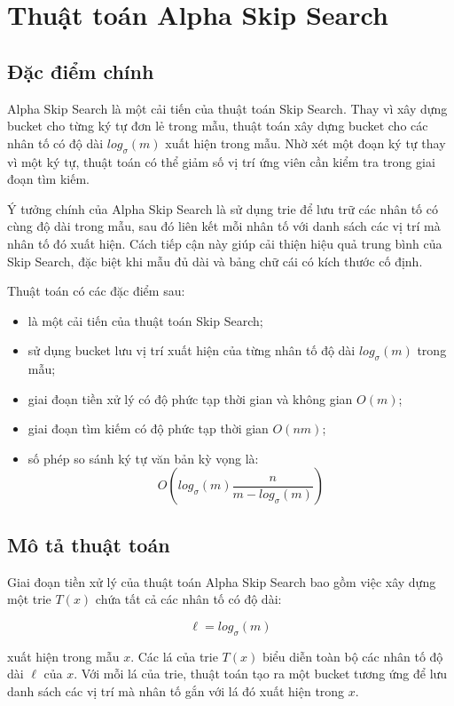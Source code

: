 \section{Thuật toán Alpha Skip Search}

\subsection{Đặc điểm chính}
Alpha Skip Search là một cải tiến của thuật toán Skip Search. Thay vì xây dựng bucket cho từng ký tự đơn lẻ trong mẫu, thuật toán xây dựng bucket cho các nhân tố có độ dài $log_{\sigma}(m)$ xuất hiện trong mẫu. Nhờ xét một đoạn ký tự thay vì một ký tự, thuật toán có thể giảm số vị trí ứng viên cần kiểm tra trong giai đoạn tìm kiếm.

Ý tưởng chính của Alpha Skip Search là sử dụng trie để lưu trữ các nhân tố có cùng độ dài trong mẫu, sau đó liên kết mỗi nhân tố với danh sách các vị trí mà nhân tố đó xuất hiện. Cách tiếp cận này giúp cải thiện hiệu quả trung bình của Skip Search, đặc biệt khi mẫu đủ dài và bảng chữ cái có kích thước cố định.

Thuật toán có các đặc điểm sau:

\begin{itemize}
    \item là một cải tiến của thuật toán Skip Search;
    \item sử dụng bucket lưu vị trí xuất hiện của từng nhân tố độ dài $log_{\sigma}(m)$ trong mẫu;
    \item giai đoạn tiền xử lý có độ phức tạp thời gian và không gian $O(m)$;
    \item giai đoạn tìm kiếm có độ phức tạp thời gian $O(nm)$;
    \item số phép so sánh ký tự văn bản kỳ vọng là:
    \[
    O(log_{\sigma}(m) \frac{n}{m - log_{\sigma}(m)})
    \]
\end{itemize}

\subsection{Mô tả thuật toán}

Giai đoạn tiền xử lý của thuật toán Alpha Skip Search bao gồm việc xây dựng một trie $T(x)$ chứa tất cả các nhân tố có độ dài:

\[
\ell = log_{\sigma}(m)
\]

xuất hiện trong mẫu $x$. Các lá của trie $T(x)$ biểu diễn toàn bộ các nhân tố độ dài $\ell$ của $x$. Với mỗi lá của trie, thuật toán tạo ra một bucket tương ứng để lưu danh sách các vị trí mà nhân tố gắn với lá đó xuất hiện trong $x$.


